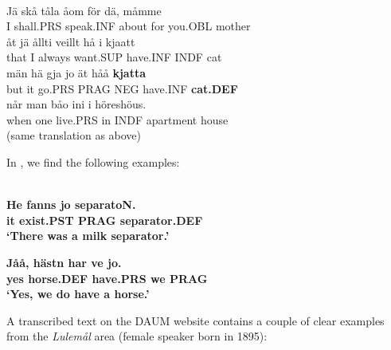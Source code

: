 \z

\ea\label{}
\\
\gll Jä  skå  tåla  åom  för  dä,  måmme\\
I  shall.PRS  speak.INF  about  for  you.OBL  mother\\
\gll åt  jä  ållti  veillt  hå  i  kjaatt\\
that  I  always  want.SUP  have.INF  INDF  cat  \\
\gll män  hä  gja  jo  ät  håå  \textbf{kjatta}\\
but  it  go.PRS  PRAG  NEG  have.INF  \textbf{cat.DEF}\\
\gll når  man  båo   ini  i  höreshöus.\\
when  one  live.PRS  in  INDF  apartment house\\
\glt (same translation as above)

\z

In \citet{Stenberg1971}, we find the following examples:


\ea\label{}
\\
\gll\bfseries
He  fanns  jo  separatoN.\\
\bfseries
it  exist.PST  PRAG  separator.DEF\\
\glt ‘There was a milk separator.’ 

\z

\ea\gll\bfseries
Jåå,  hästn  har  ve  jo.\\
\bfseries
yes  horse.DEF  have.PRS  we  PRAG\\
\glt ‘Yes, we do have a horse.’ 

\z

A transcribed text on the DAUM website contains a couple of clear examples from the \textit{Lulemål} area (female speaker born in 1895):


